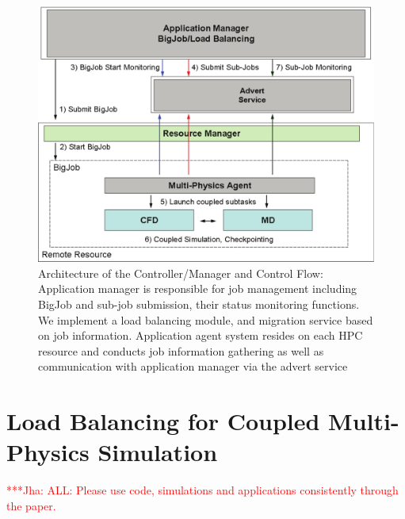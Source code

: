 \documentclass[conference,final]{IEEEtran}
\newcommand{\jhanote}[1]{ {\textcolor{red} { ***Jha: #1 }}}
\newcommand{\jhanote}[1]{}
\begin{document}
\begin{figure}
\centering
\includegraphics[scale=0.38]{Structure_of_BigJob}
\caption{\small Architecture of the Controller/Manager and Control Flow: Application manager is responsible for job management including BigJob and sub-job submission, their status monitoring functions. We implement a load balancing module, and migration service based on job information. Application agent system resides on each HPC resource and conducts job information gathering as well as communication with application manager via the advert service}
\label{Fig:BigJob_Structure}
\end{figure}



\section{Load Balancing for Coupled Multi-Physics Simulation}

\jhanote{ALL: Please use code, simulations and applications
  consistently through the paper.}
\end{document}
